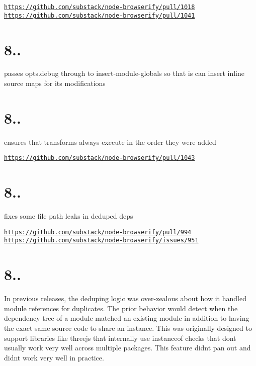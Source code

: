 \href{https://github.com/substack/node-browserify/pull/1018}{\tt https\+://github.\+com/substack/node-\/browserify/pull/1018} \href{https://github.com/substack/node-browserify/pull/1041}{\tt https\+://github.\+com/substack/node-\/browserify/pull/1041}

\section*{8..}

passes opts.\+debug through to insert-\/module-\/globals so that is can insert inline source maps for its modifications

\section*{8..}

ensures that transforms always execute in the order they were added

\href{https://github.com/substack/node-browserify/pull/1043}{\tt https\+://github.\+com/substack/node-\/browserify/pull/1043}

\section*{8..}

fixes some file path leaks in deduped deps

\href{https://github.com/substack/node-browserify/pull/994}{\tt https\+://github.\+com/substack/node-\/browserify/pull/994} \href{https://github.com/substack/node-browserify/issues/951}{\tt https\+://github.\+com/substack/node-\/browserify/issues/951}

\section*{8..}

In previous releases, the deduping logic was over-\/zealous about how it handled module references for duplicates. The prior behavior would detect when the dependency tree of a module matched an existing module in addition to having the exact same source code to share an instance. This was originally designed to support libraries like threejs that internally use {\ttfamily instanceof} checks that don\textquotesingle{}t usually work very well across multiple packages. This feature didn\textquotesingle{}t pan out and didn\textquotesingle{}t work very well in practice.

